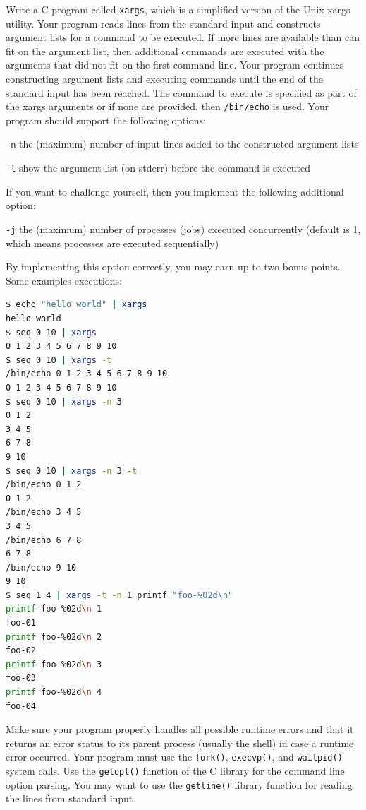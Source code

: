 \documentclass[
	12pt, %
]{fphw}
\begin{document}
\begin{problem}
Write a C program called \texttt{xargs}, which is a simplified version of the Unix xargs utility. Your program
reads lines from the standard input and constructs argument lists for a command to be executed. If
more lines are available than can fit on the argument list, then additional commands are executed
with the arguments that did not fit on the first command line. Your program continues constructing
argument lists and executing commands until the end of the standard input has been reached.
The command to execute is specified as part of the xargs arguments or if none are provided, then
\texttt{/bin/echo} is used. Your program should support the following options:
\begin{small}
\begin{description}
	\item \texttt{-n} the (maximum) number of input lines added to the constructed argument lists 
	\item \texttt{-t} show the argument list (on stderr) before the command is executed
\end{description}
\end{small}
If you want to challenge yourself, then you implement the following additional option:
\begin{small}
\begin{description}
	\item \texttt{-j} the (maximum) number of processes (jobs) executed concurrently (default is 1, which means
	processes are executed sequentially)
\end{description}
\end{small}
By implementing this option correctly, you may earn up to two bonus points.
Some examples executions:
\end{problem}
\begin{small}
\begin{lstlisting}[language=bash]
$ echo "hello world" | xargs
hello world
$ seq 0 10 | xargs
0 1 2 3 4 5 6 7 8 9 10
$ seq 0 10 | xargs -t
/bin/echo 0 1 2 3 4 5 6 7 8 9 10
0 1 2 3 4 5 6 7 8 9 10
$ seq 0 10 | xargs -n 3
0 1 2
3 4 5
6 7 8
9 10
$ seq 0 10 | xargs -n 3 -t
/bin/echo 0 1 2
0 1 2
/bin/echo 3 4 5
3 4 5
/bin/echo 6 7 8
6 7 8
/bin/echo 9 10
9 10
$ seq 1 4 | xargs -t -n 1 printf "foo-%02d\n"
printf foo-%02d\n 1
foo-01
printf foo-%02d\n 2
foo-02
printf foo-%02d\n 3
foo-03
printf foo-%02d\n 4
foo-04
\end{lstlisting}
\end{small}
\begin{problem}
Make sure your program properly handles all possible runtime errors and that it returns an error status to its parent process (usually the shell) in case a runtime error occurred.\newline
Your program must use the \texttt{fork()}, \texttt{execvp()}, and \texttt{waitpid()} system calls. Use the \texttt{getopt()}
function of the C library for the command line option parsing. You may want to use the \texttt{getline()}
library function for reading the lines from standard input.
\end{problem}
\end{document}
